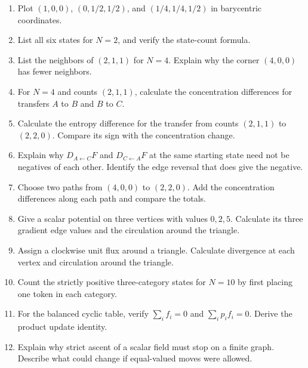 \documentclass[11pt,oneside,openany]{book}
\theoremstyle{definition}
\theoremstyle{remark}
\newenvironment{exercises}{\begin{enumerate}[label=\thechapter.\arabic*,ref=\thechapter.\arabic*,leftmargin=2.8em,itemsep=6pt]}{\end{enumerate}}
\numberwithin{equation}{chapter}
\begin{document}
\begin{exercises}

\item 

Plot \((1,0,0)\), \((0,1/2,1/2)\), and \((1/4,1/4,1/2)\) in barycentric coordinates.

\item 

List all six states for \(N=2\), and verify the state-count formula.

\item 

List the neighbors of \((2,1,1)\) for \(N=4\). Explain why the corner \((4,0,0)\) has fewer neighbors.

\item 

For \(N=4\) and counts \((2,1,1)\), calculate the concentration differences for transfers \(A\) to \(B\) and \(B\) to \(C\).

\item 

Calculate the entropy difference for the transfer from counts \((2,1,1)\) to \((2,2,0)\). Compare its sign with the concentration change.

\item 

Explain why \(D_{A\leftarrow C}F\) and \(D_{C\leftarrow A}F\) at the same starting state need not be negatives of each other. Identify the edge reversal that does give the negative.

\item 

Choose two paths from \((4,0,0)\) to \((2,2,0)\). Add the concentration differences along each path and compare the totals.

\item 

Give a scalar potential on three vertices with values \(0,2,5\). Calculate its three gradient edge values and the circulation around the triangle.

\item 

Assign a clockwise unit flux around a triangle. Calculate divergence at each vertex and circulation around the triangle.

\item 

Count the strictly positive three-category states for \(N=10\) by first placing one token in each category.

\item 

For the balanced cyclic table, verify \(\sum_i f_i=0\) and \(\sum_i p_if_i=0\). Derive the product update identity.

\item 

Explain why strict ascent of a scalar field must stop on a finite graph. Describe what could change if equal-valued moves were allowed.

\end{exercises}
\end{document}
